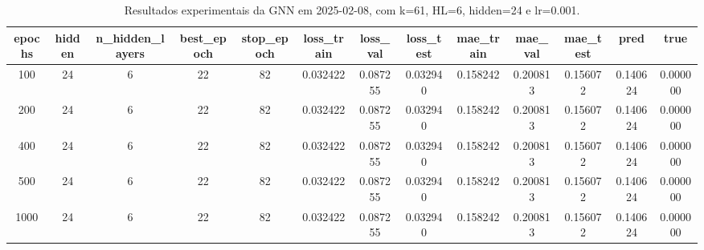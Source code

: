 \begin{table}[h]
\centering
\caption{Resultados experimentais da GNN em 2025-02-08, com k=61, HL=6, hidden=24 e lr=0.001.}
\label{tab:gnn_results_k61_hl6_h24_d20250208}
\begin{tabular}{ccccccccccccc}
\toprule
epochs & hidden & n\_hidden\_layers & best\_epoch & stop\_epoch & loss\_train & loss\_val & loss\_test & mae\_train & mae\_val & mae\_test & pred & true \\
\midrule
100 & 24 & 6 & 22 & 82 & 0.032422 & 0.087255 & 0.032940 & 0.158242 & 0.200813 & 0.156072 & 0.140624 & 0.000000 \\
200 & 24 & 6 & 22 & 82 & 0.032422 & 0.087255 & 0.032940 & 0.158242 & 0.200813 & 0.156072 & 0.140624 & 0.000000 \\
400 & 24 & 6 & 22 & 82 & 0.032422 & 0.087255 & 0.032940 & 0.158242 & 0.200813 & 0.156072 & 0.140624 & 0.000000 \\
500 & 24 & 6 & 22 & 82 & 0.032422 & 0.087255 & 0.032940 & 0.158242 & 0.200813 & 0.156072 & 0.140624 & 0.000000 \\
1000 & 24 & 6 & 22 & 82 & 0.032422 & 0.087255 & 0.032940 & 0.158242 & 0.200813 & 0.156072 & 0.140624 & 0.000000 \\
\bottomrule
\end{tabular}
\end{table}

